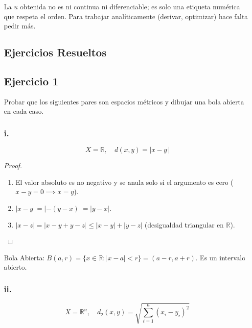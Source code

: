 \documentclass[11pt, a4paper]{article}
\begin{document}
\obs La $u$ obtenida no es ni continua ni diferenciable; es solo una etiqueta numérica que respeta
el orden. Para trabajar analíticamente (derivar, optimizar) hace falta pedir más.

\newpage

\subsection{Ejercicios Resueltos}

\subsection*{Ejercicio 1}

Probar que los siguientes pares son espacios métricos y dibujar una bola abierta en cada caso.

\subsubsection*{i.}
$$ X = \mathbb{R}, \quad d(x, y) = |x - y| $$

\begin{proof}
\begin{enumerate}
    \item El valor absoluto es no negativo y se anula solo si el argumento es cero
    ($x-y=0 \implies x=y$).
    \item $|x - y| = |-(y - x)| = |y - x|$.
    \item $|x - z| = |x - y + y - z| \le |x - y| + |y - z|$ (desigualdad triangular en $\mathbb{R}$).
\end{enumerate}
\end{proof}

Bola Abierta: $B(a, r) = \{ x \in \mathbb{R} : |x - a| < r \} = (a - r, a + r)$. Es un intervalo
abierto.

\begin{figure}[H]
\centering
{}
\end{figure}

\subsubsection*{ii.}
$$ X = \mathbb{R}^n, \quad d_2(x, y) = \sqrt{\sum_{i=1}^n (x_i - y_i)^2} $$
\end{document}
